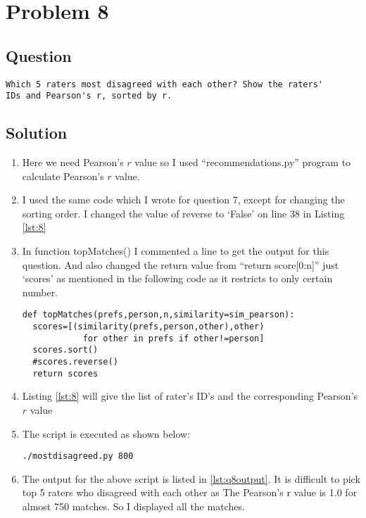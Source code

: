 \section{Problem 8}
\label{part8}
\subsection*{Question}
\begingroup
\begin{verbatim}
Which 5 raters most disagreed with each other? Show the raters'
IDs and Pearson's r, sorted by r.
\end{verbatim}
\subsection{Solution}
\begin{enumerate}
\item Here we need Pearson's $r$ value so I used ``recommendations.py'' program to calculate Pearson's $r$ value.
\item I used the same code which I wrote for question 7, except for changing the sorting order. I changed the value of reverse to `False' on line 38 in Listing \ref{lst:8}
\item In function topMatches() I commented a line to get the output for this question. And also changed the return value from ``return score[0:n]'' just `scores' as mentioned in the following code as it restricts to only certain number. 
\begin{lstlisting}[frame=single]
def topMatches(prefs,person,n,similarity=sim_pearson):
  scores=[(similarity(prefs,person,other),other) 
         	for other in prefs if other!=person]
  scores.sort()
  #scores.reverse()
  return scores
\end{lstlisting}
\item Listing \ref{lst:8} will give the list of rater's ID's and the corresponding Pearson's $r$ value
\item The script is executed as shown below:
\begin{lstlisting}[frame=single]
./mostdisagreed.py 800
\end{lstlisting}
\item The output for the above script is listed in \ref{lst:q8output}. It is difficult to pick top 5 raters who disagreed with each other as The Pearson's r value is 1.0 for almost 750 matches. So I displayed all the matches.


\end{enumerate}


\newpage

\newpage